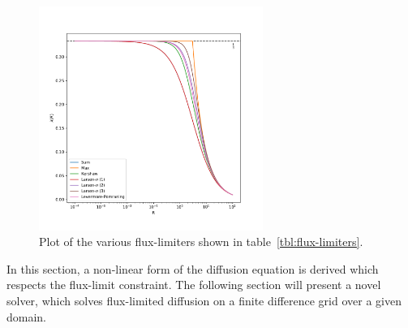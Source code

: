 \begin{figure}[h]
\centering
\includegraphics[width=0.65\textwidth]{06_fld/figures/plot_flux_limiters.pdf}
\caption{Plot of the various flux-limiters shown in table~\ref{tbl:flux-limiters}.}
\label{fig:flux-limiters}
\end{figure}
%

In this section, a non-linear form of the diffusion equation is derived which respects the flux-limit constraint. The following section will present a novel solver, which solves flux-limited diffusion on a finite difference grid over a given domain.